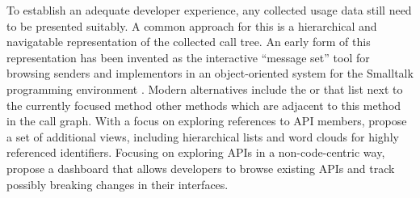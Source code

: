 To establish an adequate developer experience, any collected usage data still need to be presented suitably.
A common approach for this is a hierarchical and navigatable representation of the collected call tree.
An early form of this representation has been invented as the interactive ``message set'' tool for browsing senders and implementors in an object-oriented system for the Smalltalk programming environment \citep[section~10.1f.]{goldberg1984smalltalk}.
Modern alternatives include the  \citep{karrer2011stacksplorer} or  \citep{kramer2012blaze} that list next to the currently focused method other methods which are adjacent to this method in the call graph.
With a focus on exploring references to API members, \citet{de2013multi} propose a set of additional views, including hierarchical lists and word clouds for highly referenced identifiers.
Focusing on exploring APIs in a non-code-centric way, \citet{hora2015apiwave} propose a dashboard that allows developers to browse existing APIs and track possibly breaking changes in their interfaces.
